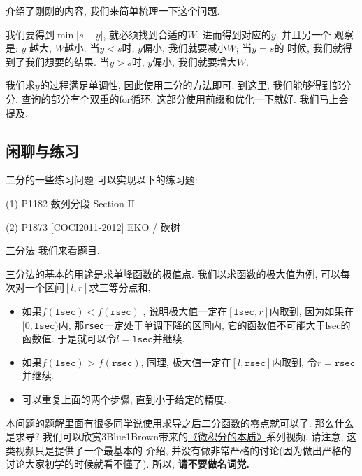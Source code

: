 介绍了刚刚的内容, 我们来简单梳理一下这个问题. 

我们要得到$\min |s-y|$, 就必须找到合适的$W$, 进而得到对应的$y$. 并且另一个
观察是: $y$ 越大, $W$越小. 当$y<s$时, $y$偏小, 我们就要减小$W$; 当$y=s$的
时候, 我们就得到了我们想要的结果. 当$y>s$时, $y$偏小, 我们就要增大$W$. 

我们求$y$的过程满足单调性, 因此使用二分的方法即可. 到这里, 我们能够得到部分分. 
查询的部分有个双重的for循环. 这部分使用前缀和优化一下就好. 我们马上会提及. 

\subsection*{闲聊与练习}

\begin{exercise}{二分的一些练习问题}
    可以实现以下的练习题: 
    
    (1) P1182 数列分段 Section II

    (2) P1873 [COCI2011-2012] EKO / 砍树    
\end{exercise}

\begin{exercise}{三分法}
    我们来看题目.

    三分法的基本的用途是求单峰函数的极值点. 我们以求函数的极大值为例, 可以每次对一个区间$[l,r]$求三等分点和, 
    \begin{itemize}[noitemsep]
        \item 如果$f(\texttt{lsec}) < f(\texttt{rsec})$ , 说明极大值一定在$[\texttt{lsec},r]$内取到, 因为如果在$[0,\texttt{lsec})$内, 那\texttt{rsec}一定处于单调下降的区间内, 它的函数值不可能大于lsec的函数值. 于是就可以令$l=\texttt{lsec}$并继续. 
        \item 如果$f(\texttt{lsec})$ > $f(\texttt{rsec})$, 同理, 极大值一定在$[l,\texttt{rsec}]$内取到, 令$r=\texttt{rsec}$并继续. 
        \item 可以重复上面的两个步骤, 直到小于给定的精度. 
    \end{itemize}

    本问题的题解里面有很多同学说使用求导之后二分函数的零点就可以了. 那么什么是求导? 
    我们可以欣赏3Blue1Brown带来的\href{https://www.bilibili.com/video/BV1qW411N7FU}{《微积分的本质》}系列视频. 请注意, 这类视频只是提供了一个最基本的
    介绍, 并没有做非常严格的讨论(因为做出严格的讨论大家初学的时候就看不懂了). 
    所以, \textbf{请不要做名词党.}
    
\end{exercise}




